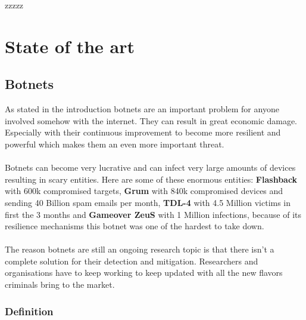 zzzzz%

\chapter{State of the art}

\label{State of the art}

\section{Botnets}
As stated in the introduction botnets are an important problem for anyone involved somehow with the internet. They can result in great economic damage.
Especially with their continuous improvement to become more resilient and powerful which makes them an even more important threat.\\\\
Botnets can become very lucrative and can infect very large amounts of devices resulting in scary entities. Here are some of these enormous entities: \textbf{Flashback} with 600k compromised targets, \textbf{Grum} with 840k compromised devices and sending 40 Billion spam emails per month, \textbf{TDL-4} with 4.5 Million victims in first the 3 months and \textbf{Gameover ZeuS} with 1 Million infections, because of its resilience mechanisms this botnet was one of the hardest to take down.\\\\
The reason botnets are still an ongoing research topic is that there isn't a complete solution for their detection and mitigation. Researchers and organisations have to keep working to keep updated with all the new flavors criminals bring to the market.
\subsection{Definition}
